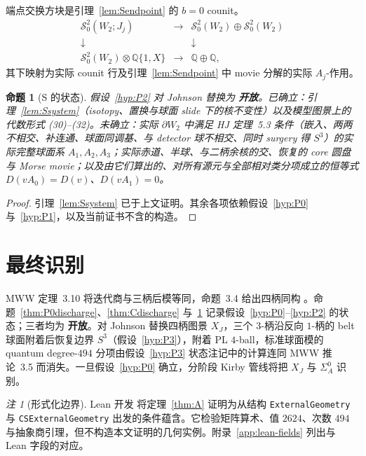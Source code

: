 \documentclass[11pt]{amsart}
\newtheorem{proposition}[theorem]{命题}
\theoremstyle{definition}
\theoremstyle{remark}
\newtheorem{remark}[theorem]{注}
\newcommand{\Q}{\mathbb{Q}}
\newcommand{\Open}{\textbf{开放}}
\begin{document}
端点交换方块是引理~\ref{lem:Sendpoint} 的 $b=0$ counit。
\[
\begin{array}{ccc}
\mathcal S^2_0(W_2;J_j)&\longrightarrow&
\mathcal S^2_0(W_2)\oplus\mathcal S^2_0(W_2)\\
\downarrow&&\downarrow\\
\mathcal S^2_0(W_2)\otimes\Q\{1,X\}&\longrightarrow&\Q\oplus\Q,
\end{array}
\]
其下映射为实际 counit 行及引理~\ref{lem:Sendpoint} 中 movie 分解的实际 \(A_j\)-作用。

\begin{proposition}[S 的状态]\label{thm:Sdischarge}
假设~\ref{hyp:P2} 对 Johnson 替换为 \Open。已确立：引理~\ref{lem:Ssystem}（isotopy、置换与球面 slide 下的核不变性）以及模型图景上的代数形式 (30)--(32)。未确立：实际 $\partial W_2$ 中满足 HJ 定理~5.3 条件（嵌入、两两不相交、补连通、球面同调基、与 detector 球不相交、同时 surgery 得 $S^3$）的实际完整球面系 $A_1,A_2,A_3$；实际赤道、半球、与二柄余核的交、恢复的 core 圆盘与 Morse movie；以及由它们算出的、对所有源元与全部相对类分项成立的恒等式 $D(vA_0)=D(v)$、$D(vA_1)=0$。
\end{proposition}

\begin{proof}
引理~\ref{lem:Ssystem} 已于上文证明。其余各项依赖假设~\ref{hyp:P0} 与~\ref{hyp:P1}，以及当前证书不含的构造。
\end{proof}
\section{最终识别}\label{sec:final-identifications}

MWW 定理~3.10 将迭代商与三柄后模等同，命题~3.4 给出四柄同构 \cite{ManolescuWalkerWedrich2023}。命题~\ref{thm:P0discharge}、\ref{thm:Cdischarge} 与~\ref{thm:Sdischarge} 记录假设~\ref{hyp:P0}--\ref{hyp:P2} 的状态；三者均为 \Open。对 Johnson 替换四柄图景 $X_J$，三个 $3$-柄沿反向 $1$-柄的 belt 球面附着后恢复边界 $S^3$（假设~\ref{hyp:P3}），附着 PL $4$-ball，标准球面模的 quantum degree-$494$ 分项由假设~\ref{hyp:P3} 状态注记中的计算连同 MWW 推论~3.5 而消失。一旦假设~\ref{hyp:P0} 确立，分阶段 Kirby 管线将把 $X_J$ 与 $\Sigma_A^0$ 识别。

\begin{remark}[形式化边界]\label{rem:lean-boundary}
Lean 开发 \cite{Lean4} 将定理~\ref{thm:A} 证明为从结构 \texttt{ExternalGeometry} 与 \texttt{CSExternalGeometry} 出发的条件蕴含。它检验矩阵算术、值 $2624$、次数 $494$ 与抽象商引理，但不构造本文证明的几何实例。附录~\ref{app:lean-fields} 列出与 Lean 字段的对应。
\end{remark}

\end{document}
